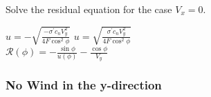 \documentclass{article}
\begin{document}
\begin{algorithm}[htbp]
\caption{Solve the residual equation for the case $V_x = 0$.}
\begin{algorithmic}


    \State $u = -\sqrt{\frac{-\sigma^\prime c_n V_y^2}{4 F \cos^2\phi}}$
\Else
    \State $u = \sqrt{\frac{\sigma^\prime c_n V_y^2}{4 F \cos^2\phi}}$
\EndIf
\\
\State $\mathcal{R}(\phi) = - \frac{\sin\phi}{u(\phi)} - \frac{\cos\phi}{V_y}$
\end{algorithmic}
\label{alg:Vx0}
\end{algorithm}

%
%
%
%
%
%
%

\subsubsection{No Wind in the y-direction}
\end{document}
